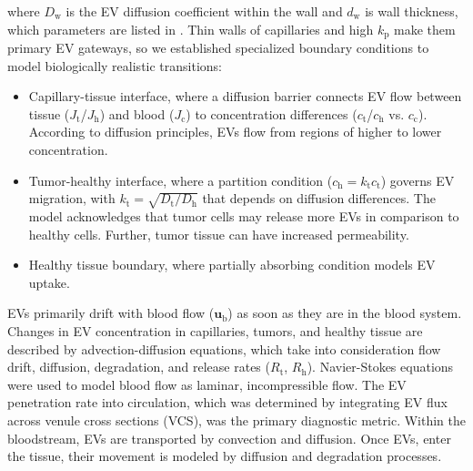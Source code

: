 \documentclass[sigconf]{acmart}
\begin{document}
where $D_{\mathrm{w}}$ is the EV diffusion coefficient within the wall and $d_{\mathrm{w}}$ is wall thickness, which parameters are listed in \cite{Zoofaghari_2023}. Thin walls of capillaries and high $k_{\mathrm{p}}$ make them primary EV gateways, so we established specialized boundary conditions to model biologically realistic transitions:
\begin{itemize}
  \item Capillary-tissue interface, where a diffusion barrier connects EV flow between tissue ($J_{\text{t}}$/$J_{\text{h}}$) and blood ($J_{\text{c}}$) to concentration differences ($c_{\text{t}}$/$c_{\text{h}}$ vs. $c_{\text{c}}$). According to diffusion principles, EVs flow from regions of higher to lower concentration.
  \item Tumor-healthy interface, where a partition condition ($c_{\text{h}} = k_{\text{t}}c_{\text{t}}$) governs EV migration, with $k_{\text{t}} = \sqrt{D_{\text{t}}/D_{\text{h}}}$ that depends on diffusion differences. The model acknowledges that tumor cells may release more EVs in comparison to healthy cells. Further, tumor tissue can have increased permeability.
  \item Healthy tissue boundary, where partially absorbing condition models EV uptake.
\end{itemize}
EVs primarily drift with blood flow  ($\bm{u}_{\text{b}}$) as soon as they are in the blood system. Changes in EV concentration in capillaries, tumors, and healthy tissue are described by advection-diffusion equations, which take into consideration flow drift, diffusion, degradation, and release rates ($R_{\text{t}}$, $R_{\text{h}}$). Navier-Stokes equations were used to model blood flow as laminar, incompressible flow. The EV penetration rate into circulation, which was determined by integrating EV flux across venule cross sections (VCS), was the primary diagnostic metric. Within the bloodstream, EVs are transported by convection and diffusion. Once EVs, enter the tissue, their movement is modeled by diffusion and degradation processes.
\end{document}
